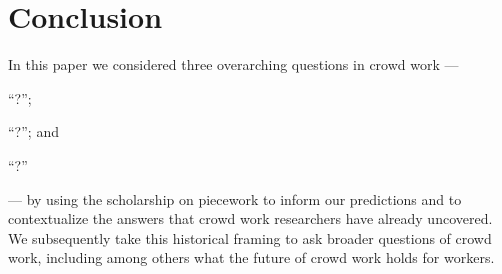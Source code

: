 \documentclass[trackingWork]{subfiles}
\begin{document}
\section{Conclusion}
In this paper we considered three overarching questions in crowd work
--- \begin{inlinelist}
  \item ``?'';
  \item ``?'';
        and
  \item ``?''
\end{inlinelist} ---
by using the scholarship on piecework to inform our predictions and
to contextualize the answers that crowd work researchers have already uncovered.
We subsequently take this historical framing to ask broader questions of crowd work,
including among others what the future of crowd work holds for workers.
\end{document}
